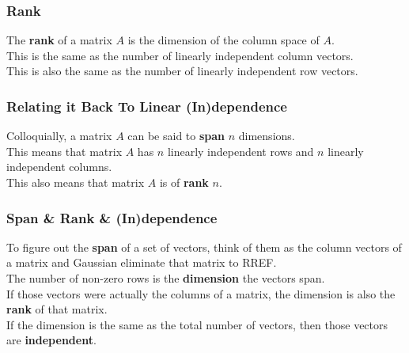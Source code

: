 \documentclass{beamer}
\begin{document}
\begin{frame}
\frametitle{Rank}
The \textbf{rank} of a matrix $A$ is the dimension of the column space of $A$. \\
This is the same as the number of linearly independent column vectors. \\
This is also the same as the number of linearly independent row vectors.
\end{frame}

\begin{frame}
\frametitle{Relating it Back To Linear (In)dependence}
Colloquially, a matrix $A$ can be said to \textbf{span} $n$ dimensions. \\
This means that matrix $A$ has $n$ linearly independent rows and $n$ linearly independent columns. \\
This also means that matrix $A$ is of \textbf{rank} $n$.
\end{frame}

\begin{frame}
\frametitle{Span \& Rank \& (In)dependence}
To figure out the \textbf{span} of a set of vectors, think of them as the column vectors of a matrix and Gaussian eliminate that matrix to RREF. \\
The number of non-zero rows is the \textbf{dimension} the vectors span. \\
If those vectors were actually the columns of a matrix, the dimension is also the \textbf{rank} of that matrix. \\
If the dimension is the same as the total number of vectors, then those vectors are \textbf{independent}.
\end{frame}

\end{document}
